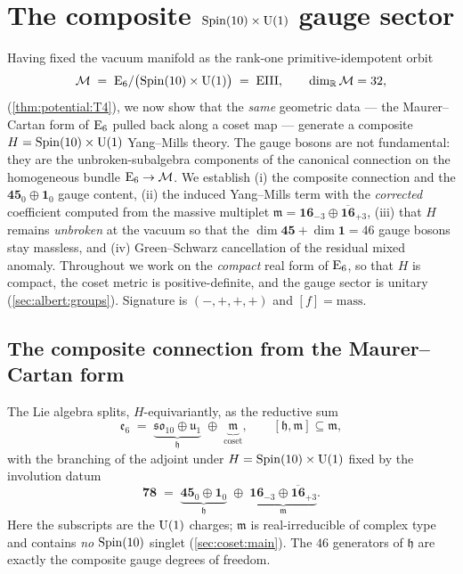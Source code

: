 \section{The composite \texorpdfstring{$\operatorname{Spin}(10)\times\mathrm{U}(1)$}{Spin(10) x U(1)} gauge sector}
\label{sec:gauge:main}

Having fixed the vacuum manifold as the rank-one primitive-idempotent
orbit
\[
  \mathcal M \;=\; \mathrm{E}_{6}/\bigl(\operatorname{Spin}(10)\times\mathrm{U}(1)\bigr) \;=\; \mathrm{EIII},
  \qquad \dim_{\mathbb R}\mathcal M = 32,
\]
(\autoref{thm:potential:T4}), we now show that the \emph{same} geometric
data --- the Maurer--Cartan form of $\mathrm{E}_{6}$ pulled back along a coset map
--- generate a composite $H=\operatorname{Spin}(10)\times\mathrm{U}(1)$ Yang--Mills theory.
The gauge bosons are not fundamental: they are the unbroken-subalgebra
components of the canonical connection on the homogeneous bundle
$\mathrm{E}_{6}\to\mathcal M$. We establish (i) the composite connection and the
$\mathbf{45}_{0}\oplus\mathbf{1}_{0}$ gauge content, (ii) the induced
Yang--Mills term with the \emph{corrected} coefficient computed from the
massive multiplet $\mathfrak m=\mathbf{16}_{-3}\oplus\overline{\mathbf{16}}_{+3}$,
(iii) that $H$ remains \emph{unbroken} at the vacuum so that the
$\dim\mathbf{45}+\dim\mathbf 1 = 46$ gauge bosons stay massless, and
(iv) Green--Schwarz cancellation of the residual mixed anomaly. Throughout
we work on the \emph{compact} real form of $\mathrm{E}_{6}$, so that $H$ is compact,
the coset metric is positive-definite, and the gauge sector is unitary
(\autoref{sec:albert:groups}). Signature is $(-,+,+,+)$ and
$[f]=\text{mass}$.

\subsection{The composite connection from the Maurer--Cartan form}
\label{sec:gauge:MC}

The Lie algebra splits, $H$-equivariantly, as the reductive sum
\begin{equation}\label{eq:gauge:split}
  \mathfrak e_6
  \;=\;
  \underbrace{\mathfrak{so}_{10}\oplus\mathfrak u_{1}}_{\mathfrak h}
  \;\oplus\;
  \underbrace{\mathfrak m}_{\text{coset}},
  \qquad
  [\mathfrak h,\mathfrak m]\subseteq\mathfrak m,
\end{equation}
with the branching of the adjoint under $H=\operatorname{Spin}(10)\times\mathrm{U}(1)$ fixed by
the involution datum
\begin{equation}\label{eq:gauge:adjoint}
  \mathbf{78}
  \;=\;
  \underbrace{\mathbf{45}_{0}\oplus\mathbf 1_{0}}_{\mathfrak h}
  \;\oplus\;
  \underbrace{\mathbf{16}_{-3}\oplus\overline{\mathbf{16}}_{+3}}_{\mathfrak m}.
\end{equation}
Here the subscripts are the $\mathrm{U}(1)$ charges; $\mathfrak m$ is real-irreducible
of complex type and contains \emph{no} $\operatorname{Spin}(10)$ singlet
(\autoref{sec:coset:main}). The $46$ generators of $\mathfrak h$ are
exactly the composite gauge degrees of freedom.

